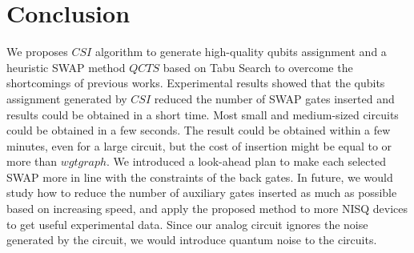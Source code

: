 \documentclass[runningheads]{llncs}
\begin{document}
\section{Conclusion}
\label{Conclusion}
We proposes $CSI$ algorithm to generate high-quality qubits assignment  and a heuristic SWAP method $QCTS$ based on Tabu Search to overcome the shortcomings of previous works.
Experimental results showed that
the qubits assignment generated by $CSI$ reduced the number of SWAP gates inserted
and results could be obtained in a short time.
Most small and medium-sized circuits could be obtained in a few seconds.
The result could be obtained within a few minutes, even for a large circuit,
but the cost of insertion might be equal to or more than $wgtgraph$.
We introduced a look-ahead plan to make each selected SWAP more in line with the constraints of the back gates.
In future, we would study how to reduce the number of auxiliary gates inserted as much as possible based on increasing speed,
and apply the proposed method to more NISQ devices to get useful experimental data.
Since our analog circuit ignores the noise generated by the circuit,
we would introduce quantum noise to the circuits.



\newpage
\appendix
\end{document}

